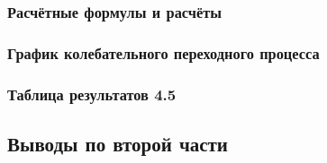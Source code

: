 \subsubsection{Расчётные формулы и расчёты}

\subsubsection{График колебательного переходного процесса}


\subsubsection{Таблица результатов 4.5}

\subsection{Выводы по второй части}
